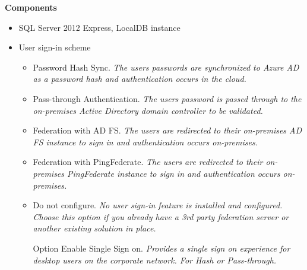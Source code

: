 \textbf{Components}
\begin{itemize}
\item SQL Server 2012 Express, LocalDB instance
\item User sign-in scheme
	\begin{itemize}
	\item Password Hash Sync. \textit{The users passwords are synchronized to Azure AD as a password hash and authentication occurs in the cloud.}
	\item Pass-through Authentication. \textit{The users password is passed through to the on-premises Active Directory domain controller to be validated.}
	\item Federation with AD FS. \textit{The users are redirected to their on-premises AD FS instance to sign in and authentication occurs on-premises.}
	\item Federation with PingFederate. \textit{ The users are redirected to their on-premises PingFederate instance to sign in and authentication occurs on-premises.}
	\item Do not configure. \textit{No user sign-in feature is installed and configured. Choose this option if you already have a 3rd party federation server or another existing solution in place.}
	\item [Option] Enable Single Sign on. \textit{Provides a single sign on experience for desktop users on the corporate network. For Hash or Pass-through.}
	\end{itemize}
\end{itemize}
